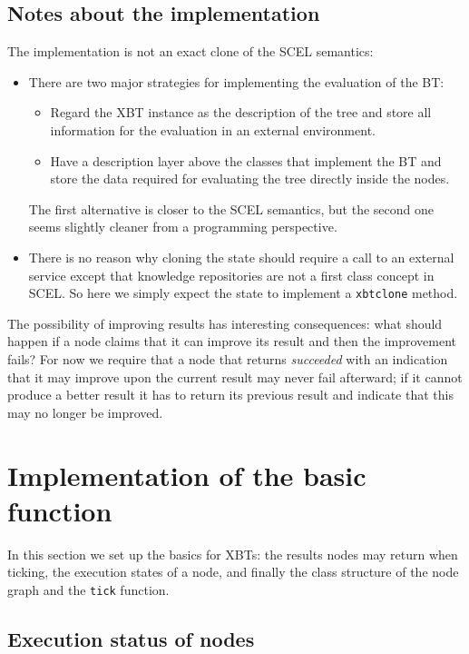 \documentclass[a4wide]{article}
\begin{document}
\subsection{Notes about the implementation}
\label{sec-2-2}

The implementation is not an exact clone of the SCEL semantics:

\begin{itemize}
\item There are two major strategies for implementing the evaluation of
the BT: 

\begin{itemize}
\item Regard the XBT instance as the description of the tree and
store all information for the evaluation in an external
environment.
\item Have a description layer above the classes that implement the
BT and store the data required for evaluating the tree directly
inside the nodes.
\end{itemize}
The first alternative is closer to the SCEL semantics, but the
second one seems slightly cleaner from a programming
perspective.

\item There is no reason why cloning the state should require a call to
an external service except that knowledge repositories are not a
first class concept in SCEL.  So here we simply expect the state
to implement a \verb~xbtclone~ method.
\end{itemize}

The possibility of improving results has interesting consequences:
what should happen if a node claims that it can improve its result
and then the improvement fails?  For now we require that a node
that returns \emph{succeeded} with an indication that it may improve
upon the current result may never fail afterward; if it cannot
produce a better result it has to return its previous result and
indicate that this may no longer be improved.

\section{Implementation of the basic function}
\label{sec-3}

In this section we set up the basics for XBTs: the results nodes may
return when ticking, the execution states of a node, and finally the
class structure of the node graph and the \verb~tick~ function.

\subsection{Execution status of nodes}
\label{sec-3-1}
\end{document}
